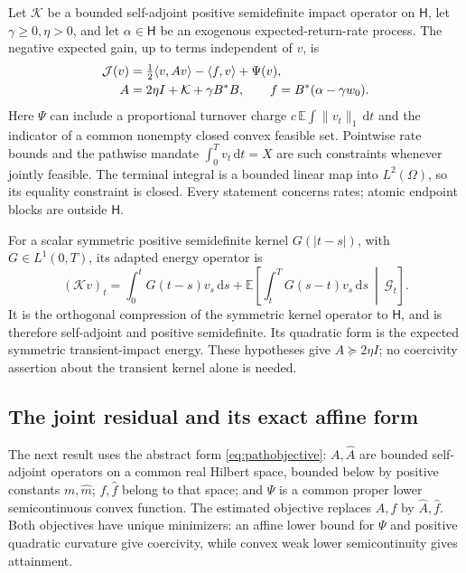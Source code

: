 \documentclass[11pt]{article}
\theoremstyle{plain}
\theoremstyle{definition}
\theoremstyle{remark}
\newcommand{\E}{\mathbb E}
\newcommand{\dd}{\,\mathrm d}
\newcommand{\norm}[1]{\lVert#1\rVert}
\newcommand{\ip}[2]{\langle#1,#2\rangle}
\begin{document}
Let \(\mathcal K\) be a bounded self-adjoint positive semidefinite
impact operator on \(\mathsf H\), let \(\gamma\ge0,\eta>0\), and
let \(\alpha\in\mathsf H\) be an exogenous expected-return-rate
process. The negative expected gain, up to terms independent of \(v\),
is
\begin{align}
\mathcal J(v)&=\tfrac12\ip{v}{Av}-\ip{f}{v}+\Psi(v),
\label{eq:pathobjective}\\
A&=2\eta I+\mathcal K+\gamma B^\ast B,\qquad
f=B^\ast(\alpha-\gamma w_0).\notag
\end{align}
Here \(\Psi\) can include a proportional turnover charge
\(c\,\E\int\norm{v_t}_1\dd t\) and the indicator of a common nonempty
closed convex feasible set. Pointwise rate bounds and the pathwise
mandate \(\int_0^T v_t\dd t=X\) are such constraints whenever jointly
feasible. The terminal integral is a bounded linear map into
\(L^2(\Omega)\), so its equality constraint is closed.
Every statement concerns rates; atomic endpoint blocks are outside
\(\mathsf H\).

For a scalar symmetric positive semidefinite kernel \(G(|t-s|)\),
with \(G\in L^1(0,T)\), its adapted energy operator is
\[
(\mathcal K v)_t=
\int_0^tG(t-s)v_s\dd s+
\E\left[\int_t^T G(s-t)v_s\dd s\ \middle|\ \mathcal G_t\right].
\]
It is the orthogonal compression of the symmetric kernel operator
to \(\mathsf H\), and is therefore self-adjoint and positive
semidefinite. Its quadratic form is the expected symmetric
transient-impact energy. These hypotheses give \(A\succeq2\eta I\);
no coercivity assertion about the transient kernel alone is needed.

\subsection{The joint residual and its exact affine form}

The next result uses the abstract form \eqref{eq:pathobjective}:
\(A,\widehat A\) are bounded self-adjoint operators on a common real
Hilbert space, bounded below by positive constants \(m,\widehat m\);
\(f,\widehat f\) belong to that space; and \(\Psi\) is a common proper
lower semicontinuous convex function.
The estimated objective replaces \(A,f\) by \(\widehat A,\widehat f\).
Both objectives have unique minimizers: an affine lower bound for
\(\Psi\) and positive quadratic curvature give coercivity, while
convex weak lower semicontinuity gives attainment.
\end{document}
